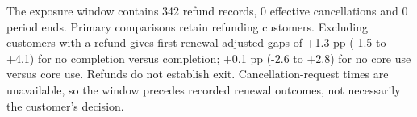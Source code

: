 \documentclass[10pt]{article}
\begin{document}
The exposure window contains 342 refund records, 0 effective cancellations and 0 period ends. Primary comparisons retain refunding customers. Excluding customers with a refund gives first-renewal adjusted gaps of +1.3 pp (-1.5 to +4.1) for no completion versus completion; +0.1 pp (-2.6 to +2.8) for no core use versus core use. Refunds do not establish exit. Cancellation-request times are unavailable, so the window precedes recorded renewal outcomes, not necessarily the customer's decision.
\end{document}
